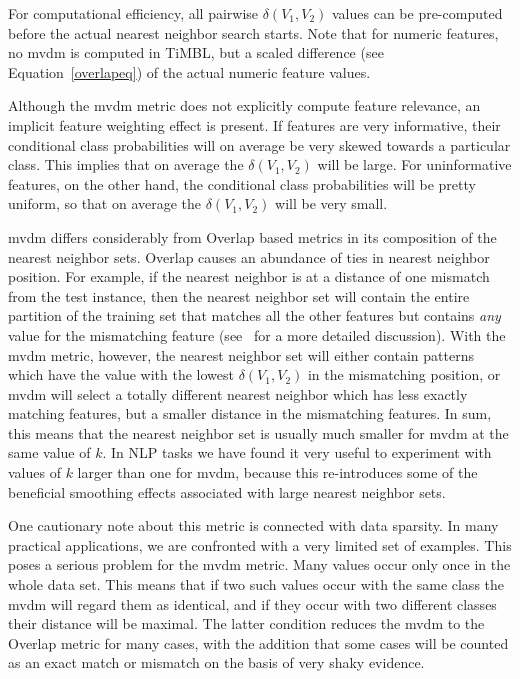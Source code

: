 \documentclass{report}
\begin{document}
For computational efficiency, all pairwise $\delta(V_{1}, V_{2})$
values can be pre-comput\-ed before the actual nearest neighbor search
starts. Note that for numeric features, no {\sc mvdm} is computed in
TiMBL, but a scaled difference (see Equation~\ref{overlapeq}) of the
actual numeric feature values.

Although the {\sc mvdm} metric does not explicitly compute feature
relevance, an implicit feature weighting effect is present. If
features are very informative, their conditional class probabilities
will on average be very skewed towards a particular class. This
implies that on average the $\delta(V_{1}, V_{2})$ will be large. For
uninformative features, on the other hand, the conditional class
probabilities will be pretty uniform, so that on average the
$\delta(V_{1}, V_{2})$ will be very small.

{\sc mvdm} differs considerably from Overlap based metrics in its
composition of the nearest neighbor sets. Overlap causes an abundance
of ties in nearest neighbor position. For example, if the nearest
neighbor is at a distance of one mismatch from the test instance, then
the nearest neighbor set will contain the entire partition of the
training set that matches all the other features but contains {\em
any} value for the mismatching feature (see~ for a
more detailed discussion). With the {\sc mvdm} metric, however, the
nearest neighbor set will either contain patterns which have the value
with the lowest $\delta(V_{1}, V_{2})$ in the mismatching position, or
{\sc mvdm} will select a totally different nearest neighbor which has
less exactly matching features, but a smaller distance in the
mismatching features. In sum, this means that the nearest neighbor set
is usually much smaller for {\sc mvdm} at the same value of $k$. In
NLP tasks we have found it very useful to experiment with values of
$k$ larger than one for {\sc mvdm}, because this re-introduces some of
the beneficial smoothing effects associated with large nearest
neighbor sets.

One cautionary note about this metric is connected with data
sparsity. In many practical applications, we are confronted with a
very limited set of examples. This poses a serious problem for the
{\sc mvdm} metric. Many values occur only once in the whole data
set. This means that if two such values occur with the same class the
{\sc mvdm} will regard them as identical, and if they occur with two
different classes their distance will be maximal. The latter condition
reduces the {\sc mvdm} to the Overlap metric for many cases, with the
addition that some cases will be counted as an exact match or mismatch
on the basis of very shaky evidence.
\end{document}
